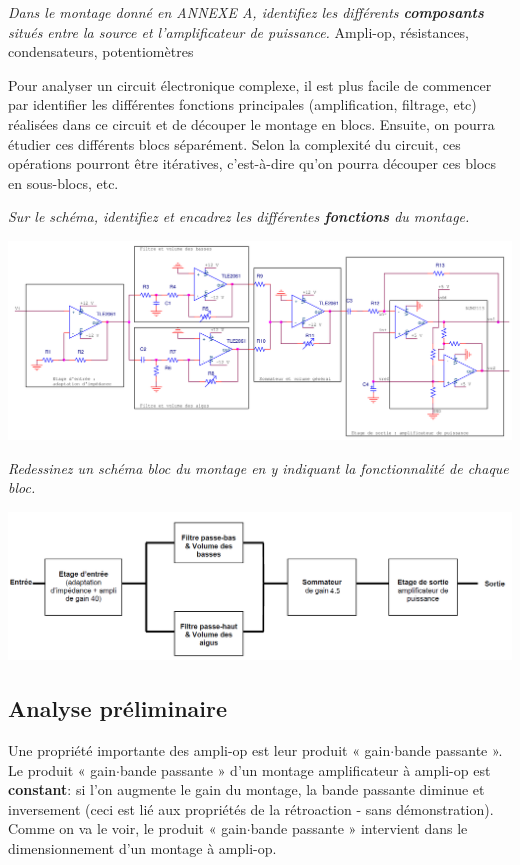 {
\textit{Dans le montage donné en ANNEXE A, identifiez les différents \textbf{composants} situés entre la source et l'amplificateur de puissance.}
}
{%
Ampli-op, résistances, condensateurs, potentiomètres
}

Pour analyser un circuit électronique complexe, il est plus facile de commencer par identifier les différentes fonctions principales (amplification, filtrage, etc) réalisées dans ce circuit et de découper le montage en blocs. Ensuite, on pourra étudier ces différents blocs séparément. Selon la complexité du circuit, ces opérations pourront être itératives, c'est-à-dire qu'on pourra découper ces blocs en sous-blocs, etc.

{
\textit{Sur le schéma, identifiez et encadrez les différentes \textbf{fonctions} du montage.}
}
{%
\begin{center}
\includegraphics[width=\textwidth]{decoupageenblocs.PNG}
\label{decoupageenblocs}
\end{center}
}

{
\textit{Redessinez un schéma bloc du montage en y indiquant la fonctionnalité de chaque bloc.}
}
{%
\begin{center}
\includegraphics[scale=0.35]{fonctionsblocs.PNG}
\label{fonctionsblocs}
\end{center}
}

\subsection{Analyse préliminaire}
\label{analysepréliminaire}
Une propriété importante des ampli-op est leur produit « gain$\cdot$bande passante ». Le produit « gain$\cdot$bande passante » d'un montage amplificateur à ampli-op est \textbf{constant}: si l'on augmente le gain du montage, la bande passante diminue et inversement (ceci est lié aux propriétés de la rétroaction - sans démonstration). Comme on va le voir, le produit « gain$\cdot$bande passante » intervient dans le dimensionnement d'un montage à ampli-op.\\

